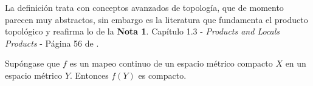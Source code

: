 \begin{tcolorbox}[colback=blue!15,colframe=blue!1!blue,title=Definición de producto topológico de \cite{naber1997topology}]
La definición trata con conceptos avanzados de topología, que de momento parecen muy abstractos, sin embargo es la literatura que fundamenta el producto topológico y reafirma lo de la \textbf{Nota 1}. Capítulo 1.3 - \textit{Products and Locals Products} - Página 56 de \cite{naber1997topology}.
\end{tcolorbox}
\begin{tcolorbox}[colback=gray!15,colframe=gray!1!gray,title= Teorema 4.14 de \cite{rudin1976principles} ]
Supóngase que $f$ es un mapeo continuo de un espacio métrico compacto $X$ en un espacio métrico $Y$. Entonces $f(Y)$ es compacto. 
\end{tcolorbox}

